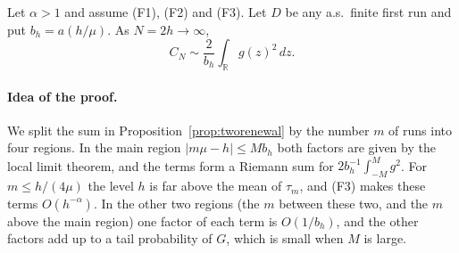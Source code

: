 \begin{proposition}\label{prop:C-center}
Let $\alpha>1$ and assume \textup{(F1)}, \textup{(F2)} and \textup{(F3)}. Let $D$ be any
a.s.\ finite first run and put $b_h=a(h/\mu)$. As $N=2h\to\infty$,
\[
C_N\sim\frac2{b_h}\int_{\mathbb R}g(z)^2\,dz .
\]
\end{proposition}

\paragraph{Idea of the proof.}
We split the sum in Proposition~\ref{prop:tworenewal} by the number $m$ of runs into four
regions. In the main region $\lvert m\mu-h\rvert\le Mb_h$ both factors are given by the
local limit theorem, and the terms form a Riemann sum for $2b_h^{-1}\int_{-M}^Mg^2$. For
$m\le h/(4\mu)$ the level $h$ is far above the mean of $\tau_m$, and (F3) makes these terms
$O(h^{-\alpha})$. In the other two regions (the $m$ between these two, and the $m$ above
the main region) one factor of each term is $O(1/b_h)$, and the other factors add up to a
tail probability of $G$, which is small when $M$ is large.

